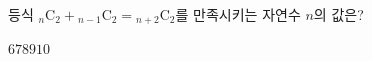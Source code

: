 \hspace*{2mm}\begin{minipage}[t]{\dimexpr\linewidth-2mm\relax}\vspace{0pt}
등식 ${}_n\mathrm{C}_2+{}_{n-1}\mathrm{C}_2={}_{n+2}\mathrm{C}_2$를 만족시키는 자연수 $n$의 값은?
\begin{choices32}{$6$}{$7$}{$8$}{$9$}{$10$}\end{choices32}\end{minipage}
